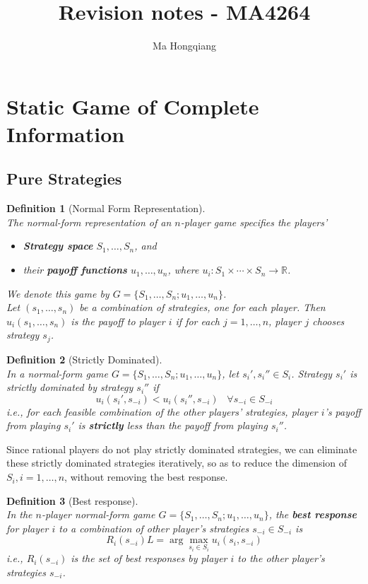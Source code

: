 \documentclass[12pt]{article}
\newtheorem{definition}{Definition}[section]
\theoremstyle{definition}
\begin{document}
\title{Revision notes - MA4264}
\author{Ma Hongqiang}
\maketitle
\tableofcontents

\clearpage
\twocolumn
\section{Static Game of Complete Information}
\subsection{Pure Strategies}
\begin{definition}[Normal Form Representation]
\hfill\\\normalfont
The normal-form representation of an $n$-player game specifies the players'
\begin{itemize}
  \item \textbf{Strategy space} $S_1,\ldots, S_n$, and 
  \item their \textbf{payoff functions} $u_1, \ldots, u_n$, where $u_i: S_1\times \cdots\times S_n \to \mathbb{R}$.
\end{itemize}
We denote this game by $G=\{S_1,\ldots, S_n; u_1,\ldots, u_n\}$.\\
Let $(s_1,\ldots, s_n)$ be a combination of strategies, one for each player. Then $u_i(s_1,\ldots, s_n)$ is the payoff to player $i$ if for each $j=1,\ldots, n$, player $j$ chooses strategy $s_j$.
\end{definition}
\begin{definition}[Strictly Dominated]
\hfill\\\normalfont In a normal-form game $G=\{S_1,\ldots, S_n; u_1,\ldots, u_n\}$, let $s_i', s_i''\in S_i$. Strategy $s_i'$ is strictly dominated by strategy $s_i''$ if 
\[
u_i(s_i', s_{-i})<u_i(s_i'', s_{-i})\;\;\;\forall s_{-i}\in S_{-i}
\]
i.e., for each feasible combination of the other players' strategies, player $i$'s payoff from playing $s_i'$ is \textbf{strictly} less than the payoff from playing $s_i''$.
\end{definition}
Since rational players do not play strictly dominated strategies, we can eliminate these strictly dominated strategies iteratively, so as to reduce the dimension of $S_i, i=1,\ldots, n$, without removing the best response.
\begin{definition}[Best response]
\hfill\\\normalfont In the $n$-player normal-form game $G=\{S_1,\ldots, S_n; u_1,\ldots, u_n\}$, the \textbf{best response} for player $i$ to a combination of other player's strategies $s_{-i}\in S_{-i}$ is
\[
R_i(s_{-i})L=\arg\max_{s_i\in S_i}u_i(s_i, s_{-i})
\]
i.e., $R_i(s_{-i})$ is the \textit{set of best responses} by player $i$ to the other player's strategies $s_{-i}$.
\end{definition}
\end{document}
